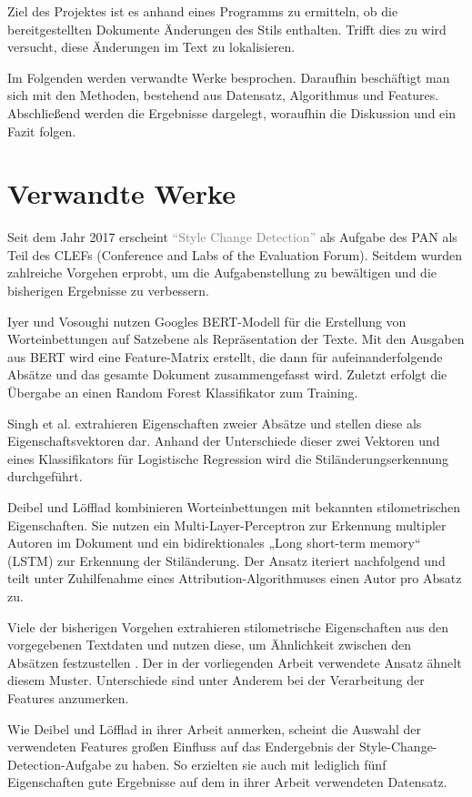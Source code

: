 \documentclass[conference]{IEEEtran}
\begin{document}
	Ziel des Projektes ist es anhand eines Programms zu ermitteln, ob die bereitgestellten Dokumente Änderungen des Stils enthalten. Trifft dies zu wird versucht, diese Änderungen im Text zu lokalisieren.
	
	Im Folgenden werden verwandte Werke besprochen. Daraufhin beschäftigt man sich mit den Methoden, bestehend aus Datensatz, Algorithmus und Features. Abschließend werden die Ergebnisse dargelegt, woraufhin die Diskussion und ein Fazit folgen.
	
\section{Verwandte Werke}
Seit dem Jahr 2017 erscheint \textcolor{gray}{\enquote{Style Change Detection}} als Aufgabe des PAN als Teil des CLEFs (Conference and Labs of the Evaluation Forum). Seitdem wurden zahlreiche Vorgehen erprobt, um die Aufgabenstellung zu bewältigen und die bisherigen Ergebnisse zu verbessern. \cite{vw_b1} 

Iyer und Vosoughi \cite{vw_b2} nutzen Googles BERT-Modell für die Erstellung von Worteinbettungen auf Satzebene als Repräsentation der Texte. Mit den Ausgaben aus BERT wird eine Feature-Matrix erstellt, die dann für aufeinanderfolgende Absätze und das gesamte Dokument zusammengefasst wird. Zuletzt erfolgt die Übergabe an einen Random Forest Klassifikator zum Training.

Singh et al. \cite{vw_b3} extrahieren Eigenschaften zweier Absätze und stellen diese als Eigenschaftsvektoren dar. Anhand der Unterschiede dieser zwei Vektoren und eines Klassifikators für Logistische Regression wird die Stiländerungserkennung durchgeführt. 

Deibel und Löfflad \cite{vw_b4} kombinieren Worteinbettungen mit bekannten stilometrischen Eigenschaften. Sie nutzen ein Multi-Layer-Perceptron zur Erkennung multipler Autoren im Dokument und ein bidirektionales „Long short-term memory“ (LSTM) zur Erkennung der Stiländerung. Der Ansatz iteriert nachfolgend und teilt unter Zuhilfenahme eines Attribution-Algorithmuses einen Autor pro Absatz zu.

Viele der bisherigen Vorgehen extrahieren stilometrische Eigenschaften aus den vorgegebenen Textdaten und nutzen diese, um Ähnlichkeit zwischen den Absätzen festzustellen \cite{vw_b5,vw_b6,vw_b7}. Der in der vorliegenden Arbeit verwendete Ansatz ähnelt diesem Muster. Unterschiede sind unter Anderem bei der Verarbeitung der Features anzumerken. 

Wie Deibel und Löfflad \cite[S.9]{vw_b4} in ihrer Arbeit anmerken, scheint die Auswahl der verwendeten Features großen Einfluss auf das Endergebnis der Style-Change-Detection-Aufgabe zu haben. So erzielten sie auch mit lediglich fünf Eigenschaften gute Ergebnisse auf dem in ihrer Arbeit verwendeten Datensatz.  
\end{document}
